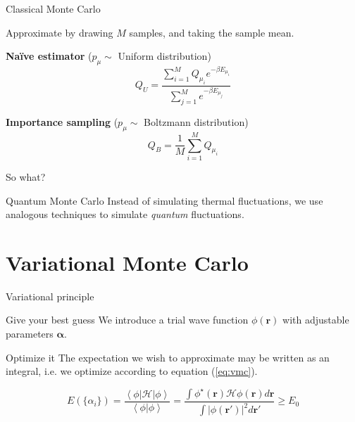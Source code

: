 \documentclass{beamer}
\begin{document}
    \begin{frame}{Classical Monte Carlo}
  
  	Approximate by drawing $M$ samples, and taking the sample mean.
  	
  	\textbf{Na\"ive estimator} ($p_\mu \sim$ Uniform distribution)
  		\begin{equation*}
    		Q_U = \frac{\sum_{i=1}^M Q_{\mu_i} e^{-\beta E_{\mu_i}}}{\sum_{j=1}^M e^{-\beta E_{\mu_j}}} 
 		\end{equation*}

      \textbf{Importance sampling} ($p_\mu \sim$ Boltzmann distribution)
      	\begin{equation*}
    		Q_B = \frac{1}{M} \sum_{i=1}^M Q_{\mu_i}
 		\end{equation*}

  \end{frame}
  
  \begin{frame}{So what?}
  
  	\begin{block}{Quantum Monte Carlo}
        Instead of simulating thermal fluctuations, we use analogous techniques to simulate \emph{quantum} fluctuations.
     \end{block}  

  \end{frame}
  
  \section{Variational Monte Carlo}
  	\begin{frame}{Variational principle}
	  	\begin{block}{Give your best guess}
  	We introduce a trial wave function $\phi (\bm r)$ with adjustable parameters $\bm \alpha$. 
  		\end{block}
  		\begin{block}{Optimize it}
  	The expectation we wish to approximate may be written as an integral, i.e. we optimize according to equation (\ref{eq:vmc}).
  	\end{block}
  	\begin{equation}\label{eq:vmc}
    E (\{\alpha_i \}) = \frac{\left\langle \phi | \mathcal{H} | \phi \right\rangle}{\left\langle \phi | \phi \right\rangle} = \frac{\int \phi^\star (\bm r) \mathcal{H} \phi (\bm r) d\bm r}{\int | \phi (\bm r') |^2 d\bm r'} \ge E_0
  	\end{equation}
  	
  	\end{frame}
\end{document}
